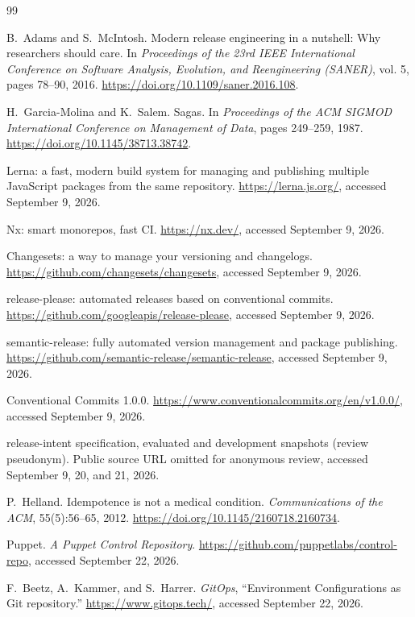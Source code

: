 \begin{thebibliography}{99}

B.~Adams and S.~McIntosh.
Modern release engineering in a nutshell: Why researchers should care.
In \emph{Proceedings of the 23rd IEEE International Conference on
Software Analysis, Evolution, and Reengineering (SANER)}, vol. 5, pages 78--90, 2016.
\url{https://doi.org/10.1109/saner.2016.108}.

H.~Garcia-Molina and K.~Salem.
Sagas.
In \emph{Proceedings of the ACM SIGMOD International Conference on
Management of Data}, pages 249--259, 1987.
\url{https://doi.org/10.1145/38713.38742}.

Lerna: a fast, modern build system for managing and publishing multiple
JavaScript packages from the same repository.
\url{https://lerna.js.org/}, accessed September 9, 2026.

Nx: smart monorepos, fast CI.
\url{https://nx.dev/}, accessed September 9, 2026.

Changesets: a way to manage your versioning and changelogs.
\url{https://github.com/changesets/changesets}, accessed September 9, 2026.

release-please: automated releases based on conventional commits.
\url{https://github.com/googleapis/release-please}, accessed September 9, 2026.

semantic-release: fully automated version management and package
publishing.
\url{https://github.com/semantic-release/semantic-release},
accessed September 9, 2026.

Conventional Commits 1.0.0.
\url{https://www.conventionalcommits.org/en/v1.0.0/}, accessed September 9, 2026.

\lang{} release-intent specification, evaluated and development snapshots
(review pseudonym).
Public source URL omitted for anonymous review,
accessed September 9, 20, and 21, 2026.

P.~Helland.
Idempotence is not a medical condition.
\emph{Communications of the ACM}, 55(5):56--65, 2012.
\url{https://doi.org/10.1145/2160718.2160734}.

Puppet.
\emph{A Puppet Control Repository}.
\url{https://github.com/puppetlabs/control-repo}, accessed September 22, 2026.

F.~Beetz, A.~Kammer, and S.~Harrer.
\emph{GitOps}, ``Environment Configurations as Git repository.''
\url{https://www.gitops.tech/}, accessed September 22, 2026.


\end{thebibliography}
